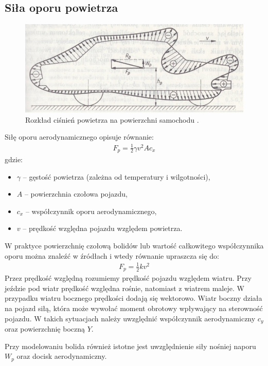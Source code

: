 \documentclass{article}
\begin{document}
	\subsection{Siła oporu powietrza}
	\begin{figure}[h!]
		\centering
		\includegraphics{rozklad_sil_powietrza.jpg}
		\caption{Rozkład ciśnień powietrza na powierzchni samochodu \cite{Arczynski}.}
		\label{fig:rozklad_sil_powietrza}
	\end{figure}
	Siłę oporu aerodynamicznego opisuje równanie:
	\begin{align}
		F_p=\frac{1}{2}\gamma v^2Ac_x
	\end{align}
	gdzie:
	\begin{itemize}
		\item $\gamma$ – gęstość powietrza (zależna od temperatury i wilgotności),
		\item $A$ – powierzchnia czołowa pojazdu,
		\item $c_x$ – współczynnik oporu aerodynamicznego,
		\item $v$ – prędkość względna pojazdu względem powietrza.
	\end{itemize}
	W praktyce powierzchnię czołową bolidów lub wartość całkowitego współczynnika oporu można znaleźć w źródłach i wtedy równanie upraszcza się do:
	\begin{align}
		F_p=\frac{1}{2}kv^2
	\end{align}
	Przez prędkość względną rozumiemy prędkość pojazdu względem wiatru. Przy jeździe pod wiatr prędkość względna rośnie, natomiast z wiatrem maleje. W przypadku wiatru bocznego prędkości dodają się wektorowo. Wiatr boczny działa na pojazd siłą, która może wywołać moment obrotowy wpływający na sterowność pojazdu. W takich sytuacjach należy uwzględnić współczynnik aerodynamiczny $c_y$ oraz powierzchnię boczną $Y$.
	
	Przy modelowaniu bolida również istotne jest uwzględnienie siły nośniej naporu $W_p$ oraz docisk aerodynamiczny.
	
\end{document}
